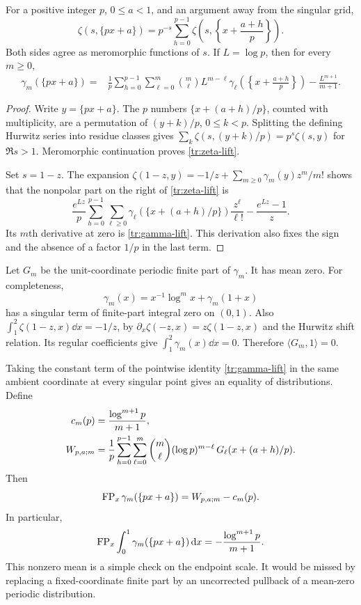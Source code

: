 \begin{lemma}\label{tr:multiplication}
For a positive integer $p$, $0\leq a<1$, and an argument away from the
singular grid,
\begin{equation}\label{tr:zeta-lift}
 \zeta(s,\{px+a\})
  =p^{-s}\sum_{h=0}^{p-1}
      \zeta\!\left(s,\left\{x+\frac{a+h}{p}\right\}\right).
\end{equation}
Both sides agree as meromorphic functions of $s$. If $L=\log p$, then
for every $m\geq0$,
\begin{align}\label{tr:gamma-lift}
 \gamma_m(\{px+a\})={}&\frac1p\sum_{h=0}^{p-1}
      \sum_{\ell=0}^m\binom m\ell L^{m-\ell}
      \gamma_\ell\!\left(\left\{x+\frac{a+h}{p}\right\}\right)
       -\frac{L^{m+1}}{m+1}.
\end{align}
\end{lemma}
\begin{proof}
Write $y=\{px+a\}$. The $p$ numbers
$\{x+(a+h)/p\}$, counted with multiplicity, are a permutation of
$(y+k)/p$, $0\leq k<p$. Splitting the defining Hurwitz series into
residue classes gives
$\sum_k\zeta(s,(y+k)/p)=p^s\zeta(s,y)$ for $\Re s>1$.
Meromorphic continuation proves \eqref{tr:zeta-lift}.

Set $s=1-z$. The expansion
$\zeta(1-z,y)=-1/z+\sum_{m\geq0}\gamma_m(y)z^m/m!$
shows that the nonpolar part on the right of \eqref{tr:zeta-lift} is
\[
 \frac{e^{Lz}}p\sum_{h=0}^{p-1}
       \sum_{\ell\geq0}\gamma_\ell(\{x+(a+h)/p\})\frac{z^\ell}{\ell!}
       -\frac{e^{Lz}-1}{z}.
\]
Its $m$th derivative at zero is \eqref{tr:gamma-lift}. This derivation
also fixes the sign and the absence of a factor $1/p$ in the last term.
\end{proof}

Let $G_m$ be the unit-coordinate periodic finite part of $\gamma_m$.
It has mean zero. For completeness,
\[
 \gamma_m(x)=x^{-1}\log^m x+\gamma_m(1+x)
\]
has a singular term of finite-part integral zero on $(0,1)$. Also
$\int_1^2\zeta(1-z,x)\dd x=-1/z$, by
$\partial_x\zeta(-z,x)=z\zeta(1-z,x)$ and the Hurwitz shift relation.
Its regular coefficients give $\int_1^2\gamma_m(x)\dd x=0$.
Therefore $\langle G_m,1\rangle=0$.

Taking the constant term of the pointwise identity
\eqref{tr:gamma-lift} in the same ambient coordinate at every singular
point gives an equality of distributions. Define
\begin{align}
 c_m(p)&=\frac{\log^{m+1}p}{m+1},\notag\\
 W_{p,a;m}&=\frac1p\sum_{h=0}^{p-1}\sum_{\ell=0}^m
       \binom m\ell(\log p)^{m-\ell}\,
              G_\ell(x+(a+h)/p).
       \label{tr:W}
\end{align}
Then
\begin{equation}\label{tr:ambient-factor}
 \operatorname{FP}_x\gamma_m(\{px+a\})=W_{p,a;m}-c_m(p).
\end{equation}
In particular,
\begin{equation}\label{tr:mean}
 \operatorname{FP}_x\int_0^1\gamma_m(\{px+a\})\,\mathrm d x
       =-\frac{\log^{m+1}p}{m+1}.
\end{equation}
This nonzero mean is a simple check on the endpoint scale. It would be
missed by replacing a fixed-coordinate finite part by an uncorrected
pullback of a mean-zero periodic distribution.

